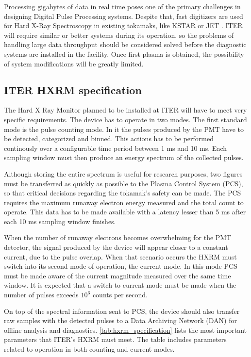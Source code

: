 Processing gigabytes of data in real time poses one of 
the primary challenges in designing Digital Pulse Processing systems.
Despite that, fast digitizers are used for Hard X-Ray Spectroscopy
in existing tokamaks, like KSTAR or JET \cite{hxrm_jet, kstar_upgrade}.
ITER will require similar or better systems during its operation,
so the problems of handling large data throughput
should be considered solved before the diagnostic systems
are installed in the facility. Once first plasma is obtained,
the possibility of system modifications will be greatly limited.
 

\subsection{ITER HXRM specification}

The Hard X Ray Monitor planned to be installed at ITER will 
have to meet very specific requirements. The device 
has to operate in two modes. The first standard mode is the pulse 
counting mode. In it the pulses produced by the PMT have to be
detected, categorized and binned. This actions has to be 
performed continously over a configurable time period between
1 ms and 10 ms. Each sampling window must then produce an 
energy spectrum of the collected pulses. 
\cite{iter_hxrm_ddd}

Although storing the entire spectrum
is useful for research purposes, two figures must be transferred 
as quickly as possible to the Plasma Control System (PCS), so that
critical decisions regarding the tokamak's safety can be made.
The PCS requires the maximum runaway electron energy measured
and the total count to operate. This data has to be made available
with a latency lesser than 5 ms after each 10 ms sampling window finishes.
\cite{iter_hxrm_ddd}

When the number of runaway electrons becomes overwhelming for
the PMT detector, the signal produced by the device will 
appear closer to a constant current, due to the pulse overlap.
When that scenario occurs the HXRM must switch into its second 
mode of operation, the current mode. In this mode PCS 
must be made aware of the current magnitude measured over the 
same time window. It is expected that a switch to current mode
must be made when the number of pulses exceeds $10^6$ counts per second.


On top of the spectral information sent to PCS,
the device should also transfer raw samples with the detected pulses
to a Data Archiving Network (DAN) for offline analysis and diagnostics.
\autoref{tab:hxrm_specification} lists the most important 
parameters that ITER's HXRM must meet. 
The table includes parameters related to operation 
in both counting and current modes.

